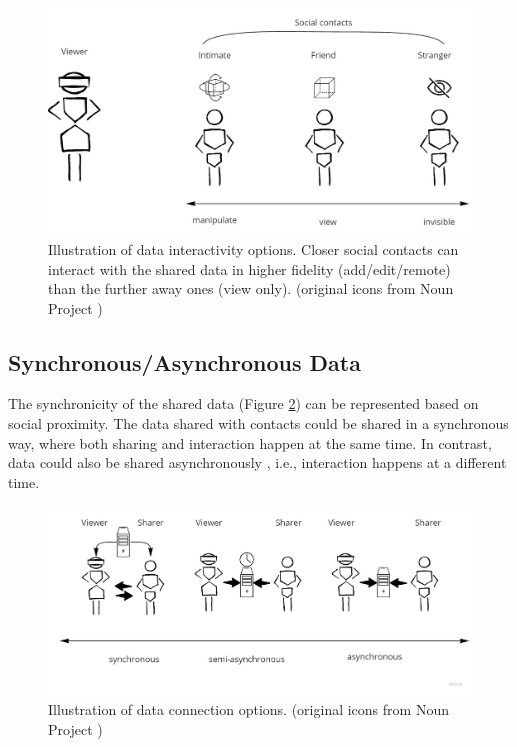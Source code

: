 \begin{figure}[ht]
    \centering
    \includegraphics[width=0.8\linewidth]{images/30-continuum/Continuum-interaction.jpg}
    \caption{Illustration of data interactivity options. Closer social contacts can interact with the shared data in higher fidelity (add/edit/remote) than the further away ones (view only). (original icons from Noun Project \cite{TheNounProjectInc.})}
    \label{fig:continuum:data-interaction}
\end{figure}



\subsection{Synchronous/Asynchronous Data}

The synchronicity of the shared data (Figure \ref{fig:continuum:data-connection}) can be represented based on social proximity. The data shared with contacts could be shared in a synchronous way, where both sharing and interaction happen at the same time. In contrast, data could also be shared asynchronously \cite{Smith2016}, i.e., interaction happens at a different time. 

\begin{figure}[ht]
    \centering
    \includegraphics[width=0.8\linewidth]{images/30-continuum/continuum-connection.jpg}
    \caption{Illustration of data connection options. (original icons from Noun Project \cite{TheNounProjectInc.})}
    \label{fig:continuum:data-connection}
\end{figure}

